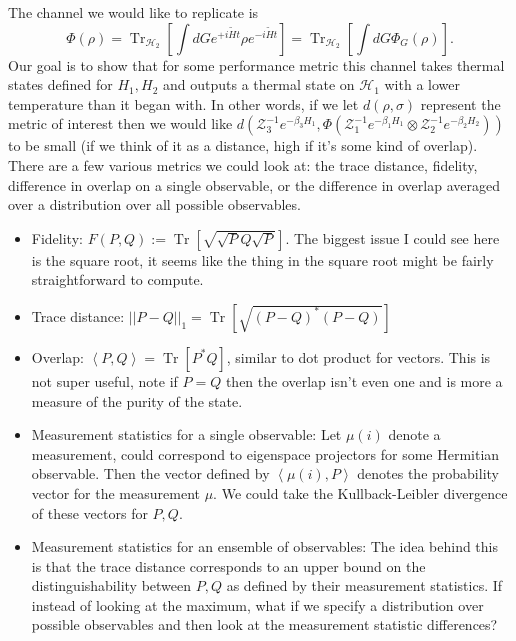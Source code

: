 \documentclass{article}
\newcommand{\parens}[1]{\left( #1 \right)}
\newcommand{\brackets}[1]{\left[ #1 \right]}
\newcommand{\norm}[1]{\left| \left| #1 \right| \right|}
\newcommand{\anglebrackets}[1]{\left< #1 \right>}
\newcommand{\overlap}[2]{\anglebrackets{#1 , #2 }}
\DeclareMathOperator{\Tr}{Tr}
\newcommand{\trace}[1]{\Tr \brackets{ #1 }}
\newcommand{\partrace}[2]{\Tr_{#1} \brackets{ #2 }}
\newcommand{\hilb}{\mathscr{H}}
\newcommand{\partfun}{\mathcal{Z}}
\begin{document}
The channel we would like to replicate is
\begin{equation}
    \Phi(\rho) = \partrace{\hilb_2}{\int dG e^{+i \widetilde{H} t} \rho e^{- i \widetilde{H} t}} = \partrace{\hilb_2}{\int dG \Phi_G(\rho)}.
\end{equation}
Our goal is to show that for some performance metric this channel takes thermal states defined for $H_1, H_2$ and outputs a thermal state on $\hilb_1$ with a lower temperature than it began with. In other words, if we let $d(\rho, \sigma)$ represent the metric of interest then we would like $d \parens{ \partfun_3^{-1} e^{-\beta_3 H_1}, \Phi\parens{\partfun_1^{-1} e^{-\beta_1 H_1} \otimes \partfun_2^{-1}e^{-\beta_2 H_2}} }$ to be small (if we think of it as a distance, high if it's some kind of overlap). There are a few various metrics we could look at: the trace distance, fidelity, difference in overlap on a single observable, or the difference in overlap averaged over a distribution over all possible observables. 

\begin{itemize}
    \item Fidelity: $F(P, Q) := \trace{\sqrt{\sqrt{P} Q \sqrt{P}}}$. The biggest issue I could see here is the square root, it seems like the thing in the square root might be fairly straightforward to compute. 
    \item Trace distance: $\norm{P - Q}_1 = \trace{\sqrt{(P-Q)^*(P-Q)}}$
    \item Overlap: $\anglebrackets{P, Q} = \trace{P^* Q}$, similar to dot product for vectors. This is not super useful, note if $P = Q$ then the overlap isn't even one and is more a measure of the purity of the state. 
    \item Measurement statistics for a single observable: Let $\mu(i)$ denote a measurement, could correspond to eigenspace projectors for some Hermitian observable. Then the vector defined by $\overlap{\mu(i)}{P}$ denotes the probability vector for the measurement $\mu$. We could take the Kullback-Leibler divergence of these vectors for $P, Q$.
    \item Measurement statistics for an ensemble of observables: The idea behind this is that the trace distance corresponds to an upper bound on the distinguishability between $P,Q$ as defined by their measurement statistics. If instead of looking at the maximum, what if we specify a distribution over possible observables and then look at the measurement statistic differences? 
\end{itemize}
\end{document}
